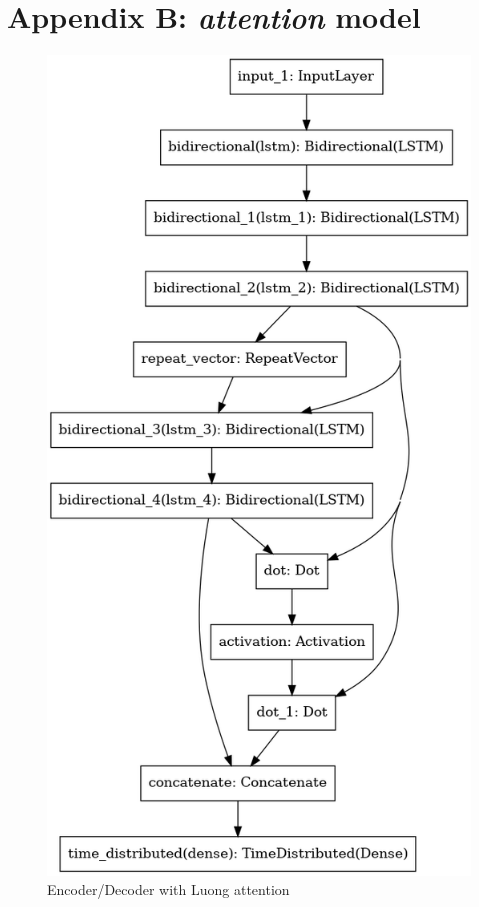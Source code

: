 \documentclass[10.5pt,a4paper,twocolumn]{article}
\begin{document}
\section*{Appendix B: \textit{attention} model}
\begin{figure}[h]
    \centering
    \includegraphics[width=0.8\linewidth]{pics/attention_model.png}
    \caption{Encoder/Decoder with Luong attention}
\end{figure}
\end{document}
